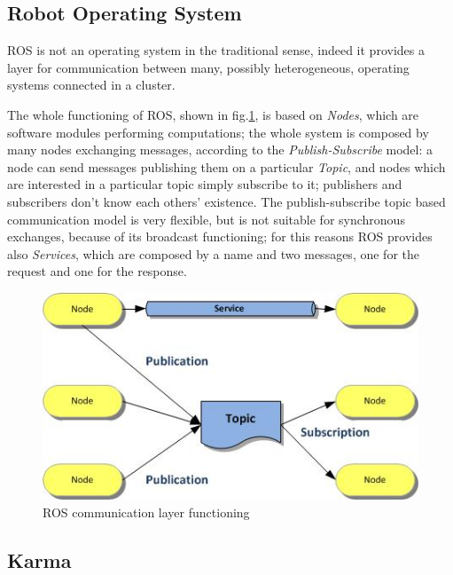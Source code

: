 \subsection{Robot Operating System}\label{ros}

ROS\cite{ros} is not an operating system in the traditional sense, indeed it provides a layer for communication between many, possibly heterogeneous, operating systems connected in a cluster.

The whole functioning of ROS, shown in fig.\ref{fig:ros}, is based on \textit{Nodes}, which are software modules performing computations; the whole system is composed by many nodes exchanging messages, according to the \textit{Publish-Subscribe} model:
a node can send messages publishing them on a particular \textit{Topic}, and nodes which are interested in a particular topic simply subscribe to it; publishers and subscribers don't know each others' existence.
The publish-subscribe topic based communication model is very flexible, but is not suitable for synchronous exchanges, because of its broadcast functioning; for this reasons ROS provides also \textit{Services}, which are composed by a name and two messages, one for the request and one for the response.





\begin{figure}[htbp]
  \centering
  \includegraphics[width=\linewidth]{pictures/ros.jpg}
  \caption{ROS communication layer functioning}
  \label{fig:ros}
\end{figure}


\newpage

\subsection{Karma}\label{karma}

